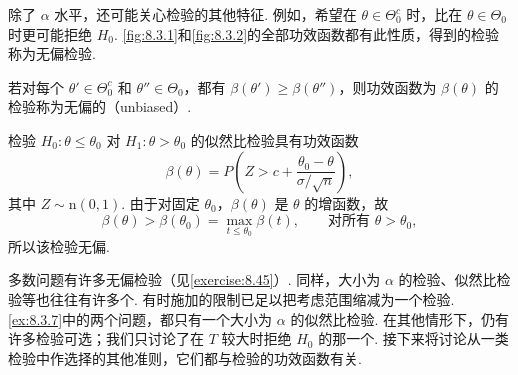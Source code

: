 除了 $\alpha$ 水平，还可能关心检验的其他特征. 例如，希望在 $\theta\in\Theta_0^c$ 时，比在 $\theta\in\Theta_0$ 时更可能拒绝 $H_0$. \autoref{fig:8.3.1}和\autoref{fig:8.3.2}的全部功效函数都有此性质，得到的检验称为无偏检验.
\begin{definition}\label{def:8.3.9}
若对每个 $\theta'\in\Theta_0^c$ 和 $\theta''\in\Theta_0$，都有 $\beta(\theta')\ge\beta(\theta'')$，则功效函数为 $\beta(\theta)$ 的检验称为无偏的（unbiased\mbox{）.}
\end{definition}
\begin{example}\label{ex:8.3.10}
检验 $H_0:\theta\le\theta_0$ 对 $H_1:\theta>\theta_0$ 的似然比检验具有功效函数
$$\beta(\theta)=P\left(Z>c+\frac{\theta_0-\theta}{\sigma/\sqrt n}\right),$$
其中 $Z\sim\mathrm n(0,1)$. 由于对固定 $\theta_0$，$\beta(\theta)$ 是 $\theta$ 的增函数，故
$$\beta(\theta)>\beta(\theta_0)=\max_{t\le\theta_0}\beta(t),\qquad\text{对所有 }\theta>\theta_0,$$
所以该检验无偏.
\end{example}
多数问题有许多无偏检验（见\autoref{exercise:8.45}\mbox{）.} 同样，大小为 $\alpha$ 的检验、似然比检验等也往往有许多个. 有时施加的限制已足以把考虑范围缩减为一个检验. \autoref{ex:8.3.7}中的两个问题，都只有一个大小为 $\alpha$ 的似然比检验. 在其他情形下，仍有许多检验可选；我们只讨论了在 $T$ 较大时拒绝 $H_0$ 的那一个. 接下来将讨论从一类检验中作选择的其他准则，它们都与检验的功效函数有关.
